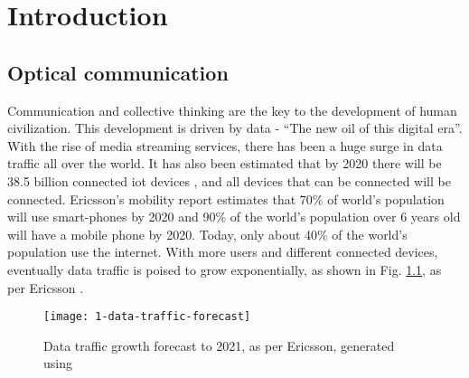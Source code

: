 \documentclass[../report.tex]{subfiles}
\begin{document}
	

	
\chapter{Introduction} 
	\section{Optical communication}
Communication and collective thinking are the key to the development of human civilization. This development is driven by data - “The new oil of this digital era”. With the rise of media streaming services, there has been a huge surge in data traffic all over the world. It has also been estimated that by 2020 there will be 38.5 billion connected \gls{iot} devices \cite{gartner_iot,juniper_iot}, and all devices that can be connected will be connected. Ericsson's mobility report \cite{ericsson_mobility_report} estimates that 70\% of world's population will use smart-phones by 2020 and 90\% of the world's population over 6 years old will have a mobile phone by 2020. Today, only about 40\% \cite{internet_users} of the world’s population use the internet. With more users and different connected devices, eventually data traffic is poised to grow exponentially, as shown in Fig. \ref{fig:1_data_traffic_forecast}, as per Ericsson \cite{ericsson_traffic_exploration}.

\begin{figure}[h]
	\centering
	\texttt{[image: 1-data-traffic-forecast]}
	\caption{Data traffic growth forecast to 2021, as per Ericsson, generated using \cite{ericsson_traffic_exploration}}
	\label{fig:1_data_traffic_forecast}
\end{figure}
\end{document}
